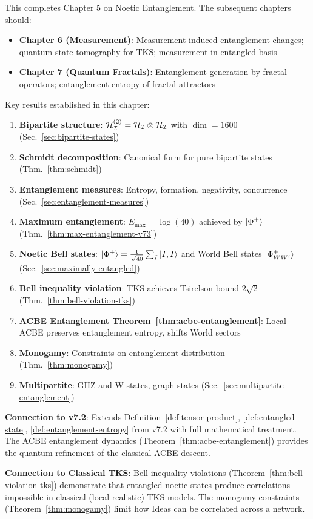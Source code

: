 \begin{tcolorbox}[colback=green!5!white,colframe=green!50!black,title=\textbf{Handoff: Next Steps},breakable]
This completes Chapter 5 on Noetic Entanglement. The subsequent chapters should:
\begin{itemize}
  \item \textbf{Chapter 6 (Measurement)}: Measurement-induced entanglement changes; quantum state tomography for TKS; measurement in entangled basis
  \item \textbf{Chapter 7 (Quantum Fractals)}: Entanglement generation by fractal operators; entanglement entropy of fractal attractors
\end{itemize}

Key results established in this chapter:
\begin{enumerate}
  \item \textbf{Bipartite structure}: $\mathcal{H}_{\mathcal{I}}^{(2)} = \mathcal{H}_{\mathcal{I}} \otimes \mathcal{H}_{\mathcal{I}}$ with $\dim = 1600$ (Sec.~\ref{sec:bipartite-states})
  \item \textbf{Schmidt decomposition}: Canonical form for pure bipartite states (Thm.~\ref{thm:schmidt})
  \item \textbf{Entanglement measures}: Entropy, formation, negativity, concurrence (Sec.~\ref{sec:entanglement-measures})
  \item \textbf{Maximum entanglement}: $E_{\max} = \log(40)$ achieved by $|\Phi^+\rangle$ (Thm.~\ref{thm:max-entanglement-v73})
  \item \textbf{Noetic Bell states}: $|\Phi^+\rangle = \frac{1}{\sqrt{40}}\sum_I |I,I\rangle$ and World Bell states $|\Phi^+_{WW'}\rangle$ (Sec.~\ref{sec:maximally-entangled})
  \item \textbf{Bell inequality violation}: TKS achieves Tsirelson bound $2\sqrt{2}$ (Thm.~\ref{thm:bell-violation-tks})
  \item \textbf{ACBE Entanglement Theorem~\ref{thm:acbe-entanglement}}: Local ACBE preserves entanglement entropy, shifts World sectors
  \item \textbf{Monogamy}: Constraints on entanglement distribution (Thm.~\ref{thm:monogamy})
  \item \textbf{Multipartite}: GHZ and W states, graph states (Sec.~\ref{sec:multipartite-entanglement})
\end{enumerate}

\textbf{Connection to v7.2}: Extends Definition~\ref{def:tensor-product}, \ref{def:entangled-state}, \ref{def:entanglement-entropy} from v7.2 with full mathematical treatment. The ACBE entanglement dynamics (Theorem~\ref{thm:acbe-entanglement}) provides the quantum refinement of the classical ACBE descent.

\textbf{Connection to Classical TKS}: Bell inequality violations (Theorem~\ref{thm:bell-violation-tks}) demonstrate that entangled noetic states produce correlations impossible in classical (local realistic) TKS models. The monogamy constraints (Theorem~\ref{thm:monogamy}) limit how Ideas can be correlated across a network.
\end{tcolorbox}

